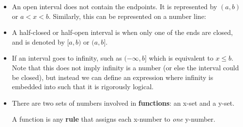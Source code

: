 \begin{itemize}
\begin{center}
\begin{tikzpicture}
            \end{tikzpicture}
    \end{center}
    \item An open interval does not contain the endpoints. It is represented by $(a,b)$ or $a<x<b$. Similarly, this can be represented on a number line:
    \begin{center}
    \end{center}
    \item A half-closed or half-open interval is when only one of the ends are closed, and is denoted by $[a,b)$ or $(a,b]$.
    \item If an interval goes to infinity, such as $(-\infty,b]$ which is equivalent to $x\le b$. Note that this does not imply infinity is a number (or else the interval could be closed), but instead we can define an expression where infinity is embedded into such that it is rigorously logical.
    \begin{center}
    \end{center}
    \item There are two sets of numbers involved in \textbf{functions}: an x-set and a y-set.
    \begin{definition}
        A function is any \textbf{rule} that assigns each x-number to \emph{one} y-number.

\end{definition}
\end{itemize}
